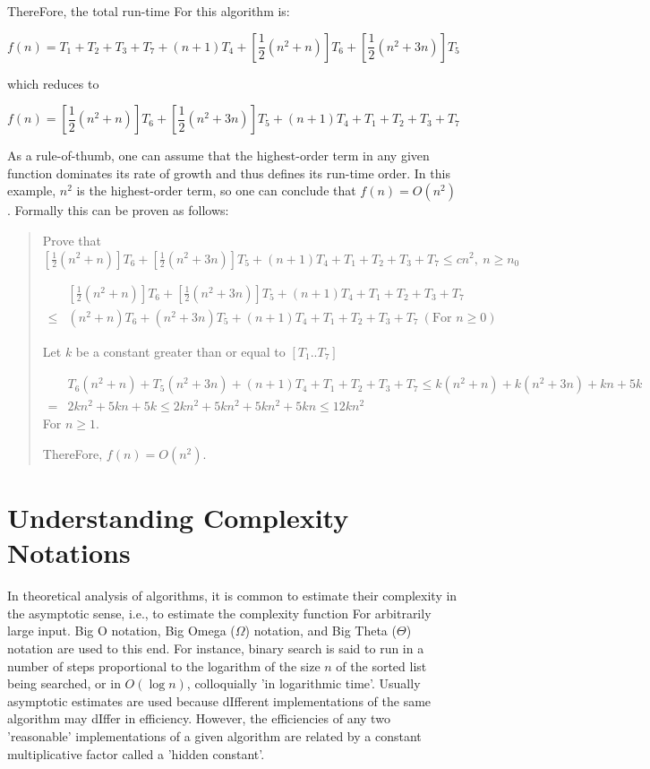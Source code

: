 \documentclass[12pt]{book} %
\begin{document}
ThereFore, the total run-time For this algorithm is:

\[
f(n) = T_1 + T_2 + T_3 + T_7 + (n + 1)T_4 + \left[ \frac{1}{2} (n^2 + n) \right] T_6 + \left[ \frac{1}{2} (n^2+3n) \right] T_5
\]

which reduces to

\[
f(n) = \left[ \frac{1}{2} (n^2 + n) \right] T_6 + \left[ \frac{1}{2} (n^2 + 3n) \right] T_5 + (n + 1)T_4 + T_1 + T_2 + T_3 + T_7
\]

As a rule-of-thumb, one can assume that the highest-order term in any given function dominates its rate of growth and thus defines its run-time order.  In this example, $n^2$ is the highest-order term, so one can conclude that $f(n) = O(n^2)$.  Formally this can be proven as follows:

\begin{quote}
Prove that $\left[ \frac{1}{2} (n^2 + n) \right] T_6 + \left[ \frac{1}{2} (n^2 + 3n) \right] T_5 + (n + 1)T_4 + T_1 + T_2 + T_3 + T_7 \le cn^2,\ n \ge n_0$

\begin{align}
&\left[ \frac{1}{2} (n^2 + n) \right] T_6 + \left[ \frac{1}{2} (n^2 + 3n) \right] T_5 + (n + 1)T_4 + T_1 + T_2 + T_3 + T_7\\
\le &( n^2 + n )T_6 + ( n^2 + 3n )T_5 + (n + 1)T_4 + T_1 + T_2 + T_3 + T_7 \ (\text{For } n \ge 0 )
\end{align}


Let $k$ be a constant greater than or equal to $[T_1..T_7]$

\begin{align}
&T_6( n^2 + n ) + T_5( n^2 + 3n ) + (n + 1)T_4 + T_1 + T_2 + T_3 + T_7 \le k( n^2 + n ) + k( n^2 + 3n ) + kn + 5k\\
= &2kn^2 + 5kn + 5k \le 2kn^2 + 5kn^2 + 5kn^2 + 5kn \le 12kn^2
\end{align}
For $n \ge 1$.

ThereFore, $f(n) = O(n^2)$.
\end{quote}

\section{Understanding Complexity Notations}
In theoretical analysis of algorithms, it is common to estimate their complexity in the asymptotic sense, i.e., to estimate the complexity function For arbitrarily large input. Big O notation, Big Omega (\(\Omega\)) notation, and Big Theta (\(\Theta\)) notation are used to this end. For instance, binary search is said to run in a number of steps proportional to the logarithm of the size $n$ of the sorted list being searched, or in $O(\log n)$, colloquially 'in logarithmic time'. Usually asymptotic estimates are used because dIfferent implementations of the same algorithm may dIffer in efficiency. However, the efficiencies of any two 'reasonable' implementations of a given algorithm are related by a constant multiplicative factor called a 'hidden constant'.
\end{document}
